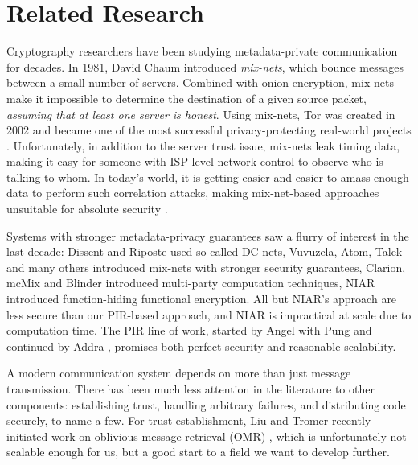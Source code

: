 \section{Related Research}

Cryptography researchers have been studying metadata-private communication for decades. In 1981, David Chaum introduced \textit{mix-nets}, which bounce messages between a small number of servers. Combined with onion encryption, mix-nets make it impossible to determine the destination of a given source packet, \textit{assuming that at least one server is honest}. Using mix-nets, Tor was created in 2002 and became one of the most successful privacy-protecting real-world projects \cite{dingledine2004tor}. Unfortunately, in addition to the server trust issue, mix-nets leak timing data, making it easy for someone with ISP-level network control to observe who is talking to whom. In today's world, it is getting easier and easier to amass enough data to perform such correlation attacks, making mix-net-based approaches unsuitable for absolute security \cite{karunanayake2021anonymisation}.

Systems with stronger metadata-privacy guarantees saw a flurry of interest in the last decade: Dissent and Riposte \cite{corrigan2010dissent,corrigan2015riposte} used so-called DC-nets, Vuvuzela, Atom, Talek and many others \cite{van2015vuvuzela,cheng2020talek,kwon2017atom} introduced mix-nets with stronger security guarantees, Clarion, mcMix and Blinder \cite{alexopoulos2017mcmix,eskandarian2021clarion,abraham2020blinder} introduced multi-party computation techniques, NIAR \cite{shi2021non,bunz2021non} introduced function-hiding functional encryption.
All but NIAR's approach are less secure than our PIR-based approach, and NIAR is impractical at scale due to computation time.
The PIR line of work, started by Angel with Pung \cite{angel2016unobservable,angel2018pir} and continued by Addra \cite{ahmad2021addra}, promises both perfect security and reasonable scalability.

A modern communication system depends on more than just message transmission. There has been much less attention in the literature to other components: establishing trust, handling arbitrary failures, and distributing code securely, to name a few. For trust establishment, Liu and Tromer recently initiated work on oblivious message retrieval (OMR) \cite{liutromer2021}, which is unfortunately not scalable enough for us, but a good start to a field we want to develop further.